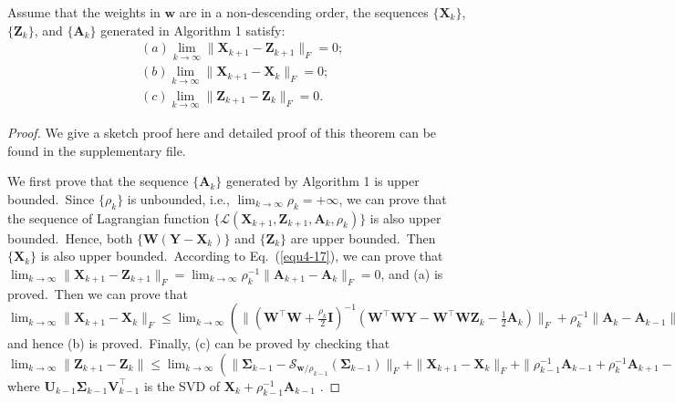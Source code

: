 \begin{theorem}
\label{th4-1}
Assume that the weights in $\bm{w}$ are in a non-descending order, the sequences $\{\mathbf{X}_{k}\}$, $\{\mathbf{Z}_{k}\}$, and $\{\mathbf{A}_{k}\}$ generated in Algorithm 1 satisfy:
\begin{align}
&(a) \lim_{k \to \infty} \|\mathbf{X}_{k+1}-\mathbf{Z}_{k+1}\|_{F}=0;
\\
&(b) \lim_{k \to \infty} \|\mathbf{X}_{k+1}-\mathbf{X}_{k}\|_{F}=0;
\\
&(c) \lim_{k \to \infty} \|\mathbf{Z}_{k+1}-\mathbf{Z}_{k}\|_{F}=0.
\end{align}
\end{theorem}
\begin{proof}
We give a sketch proof here and detailed proof of this theorem can be found in the supplementary file. 

We first prove that the sequence $\{\mathbf{A}_{k}\}$ generated by Algorithm 1 is upper bounded.\ Since $\{\rho_{k}\}$ is unbounded, i.e., $\lim_{k\to\infty}{\rho_{k}}=+\infty$, we can prove that the sequence of Lagrangian function $\{\mathcal{L}(\mathbf{X}_{k+1},\mathbf{Z}_{k+1},\mathbf{A}_{k},\rho_{k})\}$ is also upper bounded.\ Hence, both $\{\mathbf{W}(\mathbf{Y}-\mathbf{X}_{k})\}$ and $\{\mathbf{Z}_{k}\}$ are upper bounded.\ Then $\{\mathbf{X}_{k}\}$ is also upper bounded.\ According to Eq.\ (\ref{equ4-17}), we can prove that 
$
\lim_{k \to \infty} 
\|
\mathbf{X}_{k+1}
-
\mathbf{Z}_{k+1}
\|_{F}
=
\lim_{k \to \infty} 
\rho_{k}^{-1}
\|
\mathbf{A}_{k+1}
-
\mathbf{A}_{k}
\|_{F}
=
0
$,
and (a) is proved.\ Then we can prove that 
$
\lim_{k \to \infty} 
\|
\mathbf{X}_{k+1}
-
\mathbf{X}_{k}
\|_{F}
\le
\lim_{k \to \infty} 
(\|
(\mathbf{W}^{\top}\mathbf{W}
+
\frac{\rho_{k}}{2}
\mathbf{I})^{-1}
(\mathbf{W}^{\top}\mathbf{W}\mathbf{Y}
-
\mathbf{W}^{\top}\mathbf{W}\mathbf{Z}_{k}
-
\frac{1}{2}
\mathbf{A}_{k})
\|_{F}
+
\rho_{k}^{-1}\|
\mathbf{A}_{k}-\mathbf{A}_{k-1}
\|_{F})
=
0
$
and hence (b) is proved.\ Finally, (c) can be proved by checking that 
$
\lim_{k \to \infty} \|\mathbf{Z}_{k+1}-\mathbf{Z}_{k}\|
\le
\lim_{k \to \infty} 
(\|
\mathbf{\Sigma}_{k-1}-\mathcal{S}_{\bm{w}/\rho_{k-1}}(\mathbf{\Sigma}_{k-1})
\|_{F}
+
\|
\mathbf{X}_{k+1}-\mathbf{X}_{k}
\|_{F}
+
\|
\rho_{k-1}^{-1}\mathbf{A}_{k-1}
+
\rho_{k}^{-1}\mathbf{A}_{k+1}
-
\rho_{k}^{-1}\mathbf{A}_{k}
\|_{F})
=
0,
$
where $\mathbf{U}_{k-1}\mathbf{\Sigma}_{k-1}\mathbf{V}_{k-1}^{\top}$ is the SVD of $\mathbf{X}_{k}+\rho_{k-1}^{-1}\mathbf{A}_{k-1}$
.
\end{proof}


